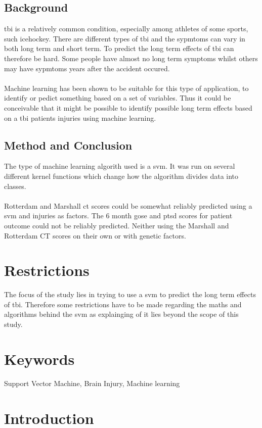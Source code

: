 \documentclass[11pt]{article}
\begin{document}
\subsection*{Background}

\gls{tbi} is a relatively common condition, especially among athletes of some sports, such icehockey. There are different types of \gls{tbi} and the sypmtoms can vary in both long term and short term. To predict the long term effects of \gls{tbi} can therefore be hard. Some people have almost no long term symptoms whilst others may have sypmtoms years after the accident occured.\\
\\
Machine learning has been shown to be suitable for this type of application, to identify or pedict something based on a set of variables. Thus it could be conceivable that it might be possible to identify possible long term effects based on a \gls{tbi} patients injuries using machine learning.

\subsection*{Method and Conclusion}
The type of machine learning algorith used is a \gls{svm}. It was run on several different kernel functions which change how the algorithm divides data into classes.\\
\\
Rotterdam and Marshall \gls{ct} scores could be somewhat reliably predicted using a \gls{svm} and injuries as factors. The 6 month \gls{gose} and \gls{ptsd} scores for patient outcome could not be reliably predicted. Neither using the Marshall and Rotterdam CT scores on their own or with genetic factors.
\section*{Restrictions}
The focus of the study lies in trying to use a \gls{svm} to predict the long term effects of \gls{tbi}. Therefore some restrictions have to be made regarding the maths and algorithms behind the \gls{svm} as explainging of it lies beyond the scope of this study.

\section*{Keywords}
Support Vector Machine, Brain Injury, Machine learning

\newpage
\tableofcontents
\newpage
\section{Introduction}
\end{document}
